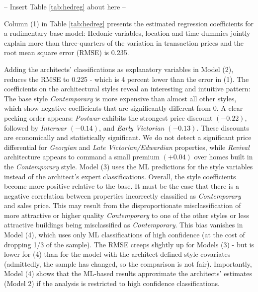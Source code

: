 \documentclass[]{article}
\begin{document}
\begin{center}
  -- Insert Table \ref{tab:hedreg} about here --
\end{center}

Column (1) in Table \ref{tab:hedreg} presents the estimated
regression coefficients for a rudimentary base model: Hedonic variables, location and time dummies jointly explain more than three-quarters of the variation in transaction prices and the root mean square error (RMSE) is 0.235. 

Adding the architects' classifications as explanatory variables in Model (2), reduces the RMSE to 0.225 - which is 4 percent lower than the error in (1). The coefficients on the architectural styles reveal an interesting and intuitive pattern: The base style \emph{Contemporary} is more expensive than almost all other styles, which show negative coefficients that are significantly
different from 0. A clear pecking order appears:  \emph{Postwar} exhibits the strongest price discount \((-0.22)\), followed by \emph{Interwar} \((-0.14)\), and \emph{Early Victorian} \((-0.13)\). These discounts are economically and statistically significant. We do not detect a significant price differential for  \emph{Georgian} and \emph{Late Victorian/Edwardian} properties, while \emph{Revival} architecture appears to command a small premium \((+0.04)\) over homes built in the \emph{Contemporary} style. Model (3) uses the ML predictions for the style variables instead of the architect's expert classifications. Overall, the style coefficients become more positive relative to the base. It must be the case that there is a negative correlation between properties incorrectly classified as \emph{Contemporary} and sales price. This may result from the disproportionate misclassification of more attractive or higher quality \emph{Contemporary} to one of the other styles or less attractive buildings being misclassified as \emph{Contemporary}. This bias vanishes in Model (4), which uses only ML classifications of high confidence (at the cost of dropping 1/3 of the sample). The RMSE creeps slightly up for Models (3) - but is lower for (4) than for the model with the architect defined style covariates (admittedly, the sample has changed, so the comparison is not fair). Importantly, Model (4) shows that the ML-based results approximate the architects' estimates (Model 2) if the analysis is restricted to high confidence classifications.   
\end{document}
